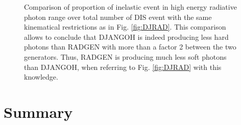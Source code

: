 \begin{figure}[htb]
\centerline{}
\caption{Comparison of proportion of inelastic event in high energy radiative photon range over total number
of DIS event with the same kinematical restrictions as in Fig. \ref{fig:DJRAD}. This comparison allows to conclude that DJANGOH is indeed producing less hard photons than
RADGEN with more than a factor 2 between the two generators. Thus, RADGEN is producing much less
soft photons than DJANGOH, when referring to Fig. \ref{fig:DJRAD} with this knowledge.}\label{fig:tabDJRAD}
\end{figure}


\section{Summary}
